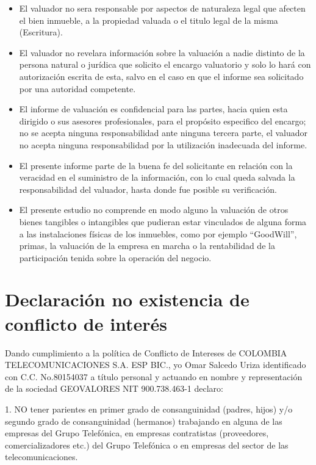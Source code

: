 \documentclass[12pt,a4paper,twoside]{article}
\begin{document}
\begin{itemize}
	\item El valuador no sera responsable por aspectos de naturaleza legal que afecten el bien inmueble, a la propiedad valuada o el titulo legal de la misma (Escritura).
	\item El valuador no revelara información sobre la valuación a nadie distinto de la persona natural o jurídica que solicito el encargo valuatorio y solo lo hará con autorización escrita de esta, salvo en el caso en que el informe sea solicitado por una autoridad competente.
	\item El informe de valuación es confidencial para las partes, hacia quien esta dirigido o sus asesores profesionales, para el propósito especifico del encargo; no se acepta ninguna responsabilidad ante ninguna tercera parte, el valuador no acepta ninguna responsabilidad por la utilización inadecuada del informe.
	\item El presente informe parte de la buena fe del solicitante en relación con la veracidad en el suministro de la información, con lo cual queda salvada la responsabilidad del valuador, hasta donde fue posible su verificación.
	\item El presente estudio no comprende en modo alguno la valuación de otros bienes tangibles o intangibles que pudieran estar vinculados de alguna forma a las instalaciones físicas de los inmuebles, como por ejemplo “GoodWill”, primas, la valuación de la empresa en marcha o la rentabilidad de la participación tenida sobre la operación del negocio.
	
\end{itemize}

\section{Declaración no existencia de conflicto de interés}

Dando cumplimiento a la política de Conflicto de Intereses de COLOMBIA\\ 
TELECOMUNICACIONES S.A. ESP BIC., yo Omar Salcedo Uriza identificado con C.C. No.80154037 a título personal y actuando en nombre y representación de la sociedad GEOVALORES NIT 900.738.463-1 declaro:

1. NO tener parientes en primer grado de consanguinidad (padres, hijos) y/o segundo grado de consanguinidad (hermanos) trabajando en alguna de las empresas del Grupo Telefónica, en empresas contratistas (proveedores, comercializadores etc.) del Grupo Telefónica o en empresas del sector de las telecomunicaciones.
\end{document}
